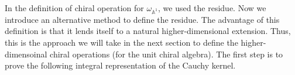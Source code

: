 \documentclass[11pt]{amsart}
\theoremstyle{definition}
\theoremstyle{remark}
\numberwithin{equation}{section}
\begin{document}
In the definition of chiral operation for $\omega_{\mathbb{A}^{1}}$, we used the residue. 
Now we introduce an alternative method to define the residue.
The advantage of this definition is that it lends itself to a natural higher-dimensional extension.
Thus, this is the approach we will take in the next section to define the higher-dimensoinal chiral operations (for the
unit chiral algebra).
The first step is to prove the following integral representation of the Cauchy kernel.
\end{document}
